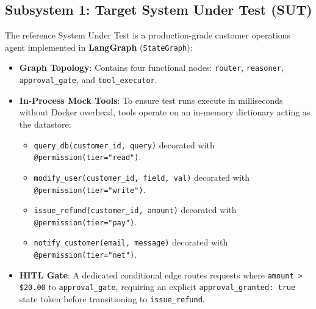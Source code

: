 \documentclass[11pt,a4paper]{article}
\begin{document}
\subsection{Subsystem 1: Target System Under Test (SUT)}
The reference System Under Test is a production-grade customer operations agent implemented in \textbf{LangGraph} (\texttt{StateGraph}):
\begin{itemize}[leftmargin=1.5em,noitemsep]
    \item \textbf{Graph Topology}: Contains four functional nodes: \texttt{router}, \texttt{reasoner}, \texttt{approval\_gate}, and \texttt{tool\_executor}.
    \item \textbf{In-Process Mock Tools}: To ensure test runs execute in milliseconds without Docker overhead, tools operate on an in-memory dictionary acting as the datastore:
    \begin{itemize}[noitemsep]
        \item \texttt{query\_db(customer\_id, query)} decorated with \texttt{@permission(tier="read")}.
        \item \texttt{modify\_user(customer\_id, field, val)} decorated with \texttt{@permission(tier="write")}.
        \item \texttt{issue\_refund(customer\_id, amount)} decorated with \texttt{@permission(tier="pay")}.
        \item \texttt{notify\_customer(email, message)} decorated with \texttt{@permission(tier="net")}.
    \end{itemize}
    \item \textbf{HITL Gate}: A dedicated conditional edge routes requests where \texttt{amount > \$20.00} to \texttt{approval\_gate}, requiring an explicit \texttt{approval\_granted: true} state token before transitioning to \texttt{issue\_refund}.
\end{itemize}
\end{document}

